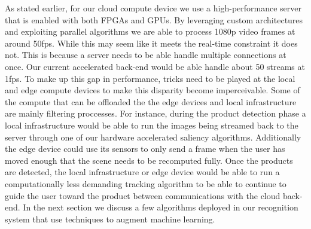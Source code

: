 As stated earlier, for our cloud compute device we use a high-performance server that is enabled with both FPGAs and GPUs. 
By leveraging custom architectures and exploiting parallel algorithms we are able to process 1080p video frames at around 50fps. 
While this may seem like it meets the real-time constraint it does not. This is because a server needs to be able handle multiple connections at once. Our current accelerated back-end would be able handle about 50 streams at 1fps. To make up this gap in performance, tricks need to be played at the local and edge compute devices to make this disparity become imperceivable. 
Some of the compute that can be offloaded the the edge devices and local infrastructure are mainly filtering proccesses. For instance, during the product detection phase a local infrastructure would be able to run the images being streamed back to the server through one of our hardware accelerated saliency algorithms. Additionally the edge device 
could use its sensors to only send a frame when the user has moved enough that the scene needs to be recomputed fully. 
Once the products are detected, the local infrastructure or edge device would be able to run a computationally less demanding tracking algorithm to be able to continue to guide the user toward the product between communications with the cloud back-end.
In the next section we discuss a few algorithms deployed in our recognition system that use techniques to augment machine learning. 

